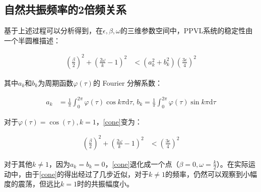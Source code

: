\subsection{自然共振频率的2倍频关系}

基于上述过程可以分析得到\cite{seyranian_multiparameter_nodate}，在$\epsilon,\beta,\omega$的三维参数空间中，PPVL系统的稳定性由一个半圆椎描述：

\begin{align}
    \left(\frac{\beta}{2}\right)^{2} + \left(\frac{2\omega}{k}-1\right)^{2} &< \left(a_{k}^{2}+b_{k}^{2}\right)(\frac{3\epsilon}{4})^{2} \label{cone}
\end{align}

其中$a_{k}$和$b_{k}$为周期函数$\varphi(\tau)$的 Fourier 分解系数：

\begin{align}
    a_{k} &= \frac{1}{\pi}\int_{0}^{2\pi}\varphi(\tau)\cos k\pi\mathrm{d}\tau,\,b_{k} = \frac{1}{\pi}\int_{0}^{2\pi}\varphi(\tau)\sin k\pi\mathrm{d}\tau
\end{align}

对于$\varphi(\tau)=\cos(\tau),k=1$，\eqref{cone}变为：

\begin{align}
    \left(\frac{\beta}{2}\right)^{2} + \left(\frac{2\omega}{k}-1\right)^{2} &< (\frac{3\epsilon}{4})^{2}
\end{align}

对于其他$k\neq1$，因为$a_{k}=b_{k}=0$，\eqref{cone}退化成一个点（$\beta=0,\omega=\frac{k}{2}$）。在实际运动中，由于\eqref{cone}的得出经过了几步近似，对于$k\neq1$的频率，仍然可以观察到小幅度的震荡，但远比$k=1$时的共振幅度小。
